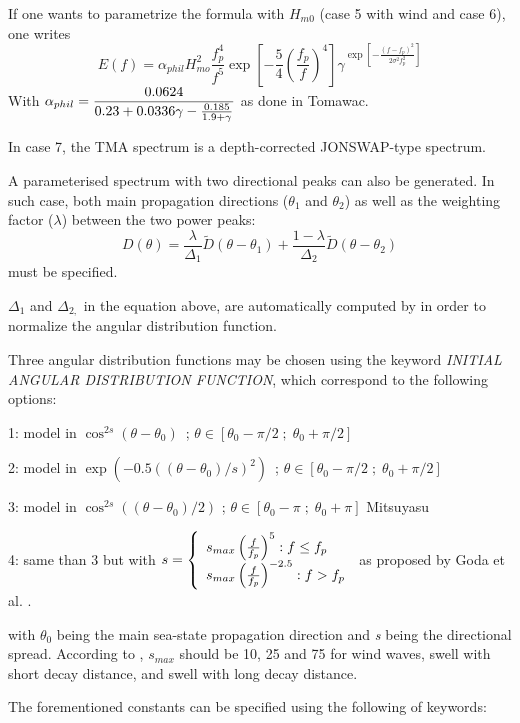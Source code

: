  If one wants to parametrize the formula with $H_{m0}$ (case 5 with wind and case 6), one writes
\[E(f)=\alpha _{phil} H_{mo}^{2} \frac{f_{p}^{4} }{f^{5} } \exp \left[-\frac{5}{4} \left(\frac{f_{p}^{} }{f^{} } \right)^{4} \right]\gamma ^{\exp \left[-\frac{\left(f-f_{p} \right)^{2} }{2\sigma ^{2} f_{p}^{2} } \right]} \]
With $\dsp \alpha _{phil} =\frac{0.0624}{0.23+0.0336\gamma -\frac{0.185}{1.9+\gamma } } $ as done in Tomawac.

 In case 7, the TMA spectrum is a depth-corrected JONSWAP-type spectrum.

 A parameterised spectrum with two directional peaks can also be generated. In such case, both main propagation directions ($\theta _{1} $ and $\theta _{2} $) as well as the weighting factor ($\lambda $) between the two power peaks:
\[D(\theta )=\frac{\lambda }{\Delta _{1} } \tilde{D}(\theta -\theta _{1} )+\frac{1-\lambda }{\Delta _{2} } \tilde{D}(\theta -\theta _{2} )\]
must be specified.

 $\Delta_{1}$ and $\Delta_{2,}$ in the equation above, are automatically computed by \tomawac in order to normalize the angular distribution function.

 Three angular distribution functions may be chosen using the keyword \textit{INITIAL ANGULAR DISTRIBUTION FUNCTION}, which correspond to the following options:

 1: model in $\cos ^{2s} (\theta -\theta _{0} )$~; $\theta \in \left[\theta _{0} -\pi /2\; ;\; \theta _{0} +\pi /2\right]$

 2: model in $\exp \left(-0.5\left(\left(\theta -\theta _{0} \right)/s\right)^{2} \right)$~; $\theta \in \left[\theta _{0} -\pi /2\; ;\; \theta _{0} +\pi /2\right]$

 3: model in $\cos ^{2s} \left(\left(\theta -\theta _{0} \right)/2\right)$ ; $\theta \in \left[\theta _{0} -\pi \; ;\; \theta _{0} +\pi \right]$ Mitsuyasu \cite{Mitsuyasu1975}

 4: same than 3 but with
 $ s=\left\{ \barr{l} s_{max} \left(\frac{f}{f_p} \right)^5 : f\le f_p \\
 s_{max} \left(\frac{f}{f_p} \right)^{-2.5} : f > f_p \earr\right. $ as proposed by Goda et al. \cite{Goda1975}. 
 
 with $\theta_{0}$ being the main sea-state propagation direction and \textit{s} being the directional spread. According to \cite{Goda1975}, $s_{max}$ should be 10, 25 and 75 for wind waves, swell with short decay distance, and swell with long decay distance.

 The forementioned constants can be specified using the following of keywords:

